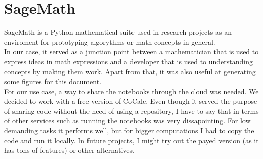 \section{SageMath}

SageMath\cite{Sage} is a Python mathematical suite used in research projects as
an enviroment for prototyping algorythms or math concepts in general.\\

In our case, it served as a junction point between a mathematician that is used
to express ideas in math expressions and a developer that is used to
understanding concepts by making them work. Apart from that, it was also
useful at generating some figures for this document.\\

For our use case, a way to share the notebooks through the cloud was needed.
We decided to work with a free version of CoCalc\cite{cocalc}. Even though it
served the purpose of sharing code without the need of using a repository,
I have to say that in terms of other services such as running the notebooks
was very dissapointing. For low demanding tasks it performs well, but for
bigger computations I had to copy the code and run it locally. In future
projects, I might try out the payed version (as it has tons of features)
or other alternatives.\\
